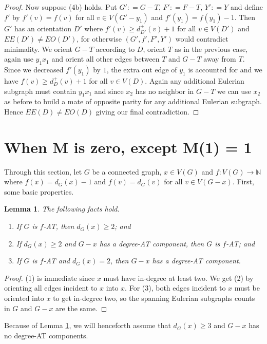 \documentclass[12pt]{article}
\theoremstyle{plain}
\newtheorem{lem}[thm]{Lemma}
\theoremstyle{definition}
\theoremstyle{remark}
\newcommand{\IN}{\mathbb{N}}
\newcommand{\func}[3]{#1\colon #2 \rightarrow #3}
\newcommand{\parens}[1]{\left( #1 \right)}
\newcommand{\DefinedAs}{\mathrel{\mathop:}=}
\begin{document}
\begin{proof}
	Now suppose (4b) holds.  Put $G' \DefinedAs G - T$, $F' \DefinedAs F - T$, $Y' \DefinedAs Y$ and define $f'$ by $f'(v) = f(v)$ for all $v \in V(G'-y_1)$ and $f'(y_1) = f(y_1) - 1$.  Then $G'$ has an orientation $D'$ where $f'(v) \ge d_{D'}^+(v) + 1$ for all $v \in V(D')$ and $EE(D') \ne EO(D')$, for otherwise $\parens{G', f', F', Y'}$ would contradict minimality.  We orient $G - T$ according to $D$, orient $T$ as in the previous case, again use $y_1x_1$ and orient all other edges between $T$ and $G-T$ away from $T$.  Since we decreased $f'(y_1)$ by $1$, the extra out edge of $y_1$ is accounted for and we have $f(v) \ge d_{D}^+(v) + 1$ for all $v \in V(D)$.  Again any additional Eulerian subgraph must contain $y_1x_1$ and since $x_2$ has no neighbor in $G-T$ we can use $x_2$ as before to build a mate of opposite parity for any additional Eulerian subgraph.  Hence $EE(D) \ne EO(D)$ giving our final contradiction.
\end{proof}

\section{When M is zero, except M(1) = 1}
Through this section, let $G$ be a connected graph, $x \in V(G)$ and $\func{f}{V(G)}{\IN}$ where $f(x) = d_G(x) - 1$ and $f(v) = d_G(v)$ for all $v \in V(G-x)$. First, some basic properties.

\begin{lem}\label{BasicPropertiesM11}
	The following facts hold.
	\begin{enumerate}
		\item If $G$ is $f$-AT, then $d_G(x) \ge 2$; and
		\item If $d_G(x) \ge 2$ and $G-x$ has a degree-AT component, then $G$ is $f$-AT; and
		\item If $G$ is $f$-AT and $d_G(x) = 2$, then $G-x$ has a degree-AT component.
	\end{enumerate}
\end{lem} 
\begin{proof}
	(1) is immediate since $x$ must have in-degree at least two.  We get (2) by orienting all edges incident to $x$ into $x$.  For (3), both edges incident to $x$ must be oriented into $x$ to get in-degree two, so the spanning Eulerian subgraphs counts in $G$ and $G-x$ are the same.
\end{proof}

Because of Lemma \ref{BasicPropertiesM11}, we will henceforth assume that $d_G(x) \ge 3$ and $G-x$ has no degree-AT components.
\end{document}
